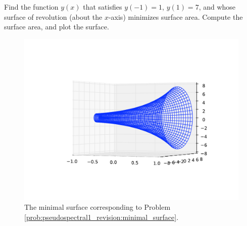 \begin{problem}
Find the function $y(x)$ that satisfies $y(-1) = 1$, $y(1) = 7$, and whose surface of revolution (about the $x$-axis) minimizes surface area. 
Compute the surface area, and plot the surface. \label{prob:pseudospectral1_revision:minimal_surface}
\end{problem}

\begin{figure}
\centering
\includegraphics[width=\textwidth]{minimal_surface.pdf}
\caption{The minimal surface corresponding to Problem  \ref{prob:pseudospectral1_revision:minimal_surface}.}
\label{fig:pseudospectral1_revision:minimal_surface}
\end{figure}








